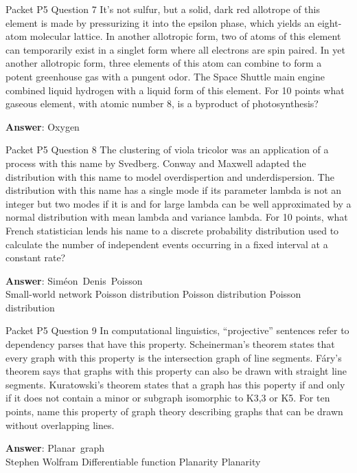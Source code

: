 \begin{frame}{Packet P5 Question 7}
It’s not sulfur, but a solid, dark red allotrope of this element   is made by pressurizing   it into the epsilon phase, which yields an eight-atom molecular lattice.   In another allotropic form, two of atoms of this element can temporarily exist in a singlet form where all electrons are spin paired. In yet   another allotropic form, three elements of this atom can combine to form a potent greenhouse gas with a pungent odor. The Space Shuttle main engine combined liquid hydrogen with a liquid form of this element. For 10 points what gaseous element, with atomic number 8, is a byproduct of photosynthesis?

\textbf{Answer}: Oxygen\\
\end{frame}

\begin{frame}{Packet P5 Question 8}
The clustering of viola   tricolor was an application of a process with this name by Svedberg. Conway and Maxwell adapted the distribution with this name to model overdispertion and underdispersion. The distribution with this name has a single mode if its parameter lambda is not an integer but two modes   if it is and for large lambda can be well approximated by a normal distribution with mean lambda and variance lambda.    For 10 points, what French statistician lends his name to a discrete probability distribution used to calculate the number of independent events occurring in a fixed interval at a constant rate?  

\textbf{Answer}: Siméon\ Denis\ Poisson\\
 Small-world network
 Poisson distribution
 Poisson distribution
 Poisson distribution
\end{frame}

\begin{frame}{Packet P5 Question 9}
In computational linguistics,   ``projective'' sentences refer to dependency parses that have this property.  Scheinerman's theorem states that every graph with this property is the intersection graph of line   segments.  Fáry's theorem says that graphs with this property can also be drawn with straight line   segments.  Kuratowski's theorem states that a graph has this poperty if and only if it does not contain a minor or subgraph isomorphic to K3,3 or K5.  For ten points, name this property of graph theory describing graphs that can be drawn   without overlapping lines.   

\textbf{Answer}: Planar\ graph\\
 Stephen Wolfram
 Differentiable function
 Planarity
 Planarity
\end{frame}

